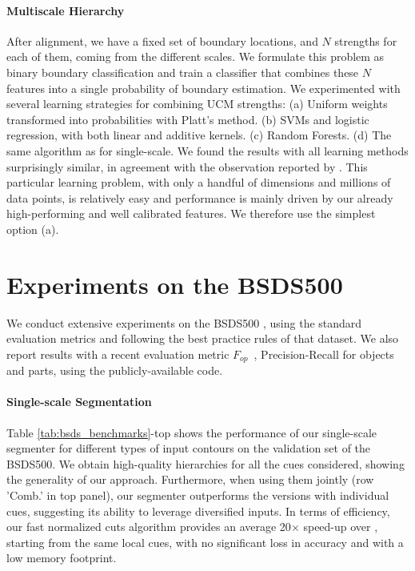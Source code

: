 \documentclass[10pt,journal,cspaper,compsoc]{IEEEtran}
\begin{document}
\paragraph*{\textbf{Multiscale Hierarchy}}
After alignment, we have a fixed set of boundary locations, and $N$ strengths for each of them, coming from the different scales. We formulate this problem as binary boundary classification and train a classifier that combines these $N$ features into a single probability of boundary estimation.
We experimented with several learning strategies for combining UCM strengths: (a) Uniform weights transformed into probabilities with Platt's method. 
(b) SVMs and logistic regression, with both linear and additive kernels. (c) Random Forests. (d) The same algorithm as for single-scale.
We found the results with all learning methods surprisingly similar, in agreement with the observation reported by \cite{Martin-etc:PAMI}.
This particular learning problem, with only a handful of dimensions and millions of data points, is relatively easy and performance is mainly driven by our already high-performing and well calibrated features. 
We therefore use the simplest option (a). 

\section{Experiments on the BSDS500}
\label{sect:bsds}
We conduct extensive experiments on the BSDS500 \cite{wwwBSDS}, using the standard evaluation metrics
and following the best practice rules of that dataset.
We also report results with a recent evaluation metric $F_\mathit{op}$~\cite{jordi:cvpr2013},
Precision-Recall for objects and parts, using the publicly-available code.


\paragraph*{\textbf{Single-scale Segmentation}}
Table \ref{tab:bsds_benchmarks}-top shows the performance of our single-scale segmenter for different types of input contours on the validation set of the BSDS500. 
We obtain high-quality hierarchies for all the cues considered, showing the generality of our approach.
Furthermore, when using them jointly (row 'Comb.' in top panel), our segmenter outperforms the versions with individual cues, suggesting its ability to leverage diversified inputs.
In terms of efficiency, our fast normalized cuts algorithm provides an average 20$\times$ speed-up over \cite{Arbelaez2011}, starting from the same local cues, with no significant loss in accuracy and with a low memory footprint. 
\end{document}
